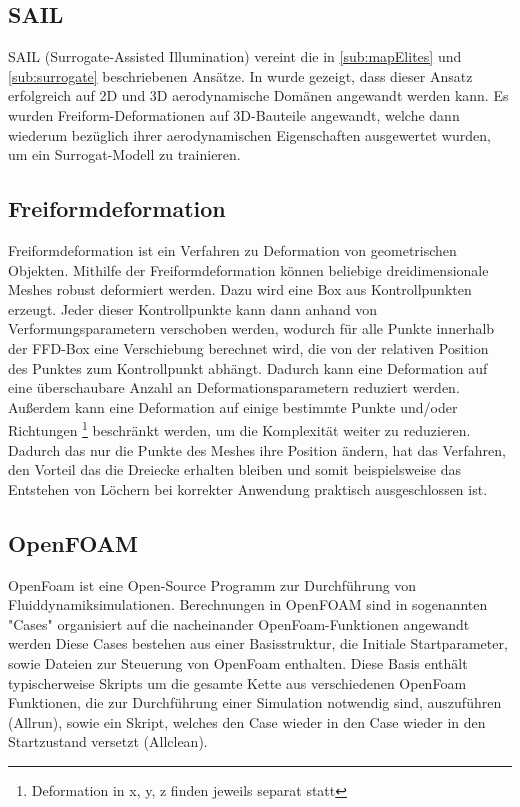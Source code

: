 \subsection{SAIL}

SAIL (Surrogate-Assisted Illumination) vereint die in \ref{sub:mapElites} und \ref{sub:surrogate} beschriebenen Ansätze.
In \cite{Gaier.6152018} wurde gezeigt, dass dieser Ansatz erfolgreich auf 2D und 3D aerodynamische Domänen angewandt werden kann.
Es wurden Freiform-Deformationen auf 3D-Bauteile angewandt, welche dann wiederum bezüglich ihrer aerodynamischen Eigenschaften ausgewertet wurden, um ein Surrogat-Modell zu trainieren.

\subsection{Freiformdeformation}

Freiformdeformation\cite{Sederberg.1986} ist ein Verfahren zu Deformation von geometrischen Objekten.
Mithilfe der Freiformdeformation können beliebige dreidimensionale Meshes robust deformiert werden.
Dazu wird eine Box aus Kontrollpunkten erzeugt.
Jeder dieser Kontrollpunkte kann dann anhand von Verformungsparametern verschoben werden, wodurch für alle Punkte innerhalb der FFD-Box eine Verschiebung berechnet wird, die von der relativen Position des Punktes zum Kontrollpunkt abhängt.
Dadurch kann eine Deformation auf eine überschaubare Anzahl an Deformationsparametern reduziert werden.
Außerdem kann eine Deformation auf einige bestimmte Punkte und/oder Richtungen
\footnote{Deformation in x, y, z finden jeweils separat statt}
beschränkt werden, um die Komplexität weiter zu reduzieren.
Dadurch das nur die Punkte des Meshes ihre Position ändern, hat das Verfahren, den Vorteil das die Dreiecke erhalten bleiben und somit beispielsweise das Entstehen von Löchern bei korrekter Anwendung praktisch ausgeschlossen ist.

\subsection{OpenFOAM}

OpenFoam  ist eine Open-Source Programm zur Durchführung von Fluiddynamiksimulationen.
Berechnungen in OpenFOAM sind in sogenannten "Cases" organisiert auf die nacheinander OpenFoam-Funktionen angewandt werden
Diese Cases bestehen aus einer Basisstruktur, die Initiale Startparameter, sowie Dateien zur Steuerung von OpenFoam enthalten.
Diese Basis enthält typischerweise Skripts um die gesamte Kette aus verschiedenen OpenFoam Funktionen, die zur Durchführung einer Simulation notwendig sind, auszuführen (Allrun), sowie ein Skript, welches den Case wieder in den Case wieder in den Startzustand versetzt (Allclean).

